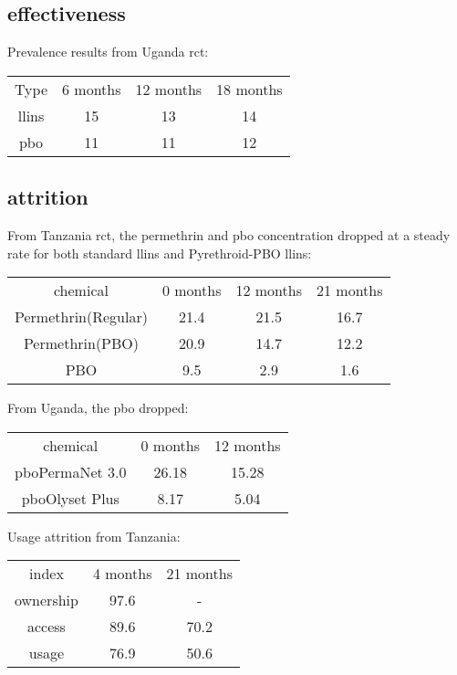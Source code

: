 \documentclass[a4paper, 12pt, twoside]{article}
\begin{document}
\subsection{effectiveness}

Prevalence results from Uganda \gls{rct}\cite{Staedke2020}:
\begin{center}
\begin{tabular}{ c c c c }
  Type & 6 months & 12 months & 18 months\\ 
  \gls{llins} & 15 & 13 & 14 \\  
  \gls{pbo} & 11 & 11 & 12\\
\end{tabular}
\end{center}

\subsection{attrition}
From Tanzania\cite{Protopopoff2018} \gls{rct}, the permethrin and \gls{pbo} concentration dropped at a steady rate for both standard \gls{llins} and Pyrethroid-PBO \gls{llins}:

\begin{center}
\begin{tabular}{ c c c c }
  chemical & 0 months & 12 months & 21 months\\ 
  Permethrin(Regular) & 21.4 & 21.5 & 16.7\\  
  Permethrin(PBO) & 20.9 & 14.7 & 12.2\\
  PBO & 9.5 & 2.9 & 1.6
\end{tabular}
\end{center}

From Uganda\cite{Staedke2020}, the \gls{pbo} dropped:
\begin{center}
\begin{tabular}{ c c c }
  chemical & 0 months & 12 months\\ 
  \gls{pbo}PermaNet 3.0 & 26.18 & 15.28\\  
  \gls{pbo}Olyset Plus & 8.17 & 5.04\\  
\end{tabular}
\end{center}

Usage attrition from Tanzania\cite{Protopopoff2018}:

\begin{center}
\begin{tabular}{ c c c }
  index & 4 months & 21 months\\ 
  ownership & 97.6 & - \\  
  access & 89.6 & 70.2\\
  usage & 76.9 & 50.6
\end{tabular}
\end{center}
\end{document}

